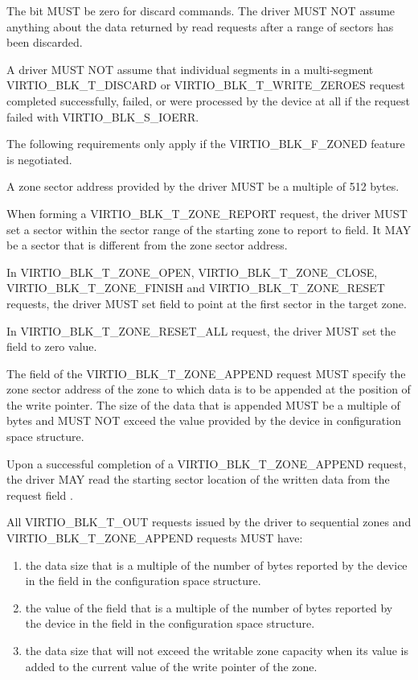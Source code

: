 The  bit MUST be zero for discard commands.  The driver
MUST NOT assume anything about the data returned by read requests after
a range of sectors has been discarded.

A driver MUST NOT assume that individual segments in a multi-segment
VIRTIO_BLK_T_DISCARD or VIRTIO_BLK_T_WRITE_ZEROES request completed
successfully, failed, or were processed by the device at all if the request
failed with VIRTIO_BLK_S_IOERR.

The following requirements only apply if the VIRTIO_BLK_F_ZONED feature is
negotiated.

A zone sector address provided by the driver MUST be a multiple of 512 bytes.

When forming a VIRTIO_BLK_T_ZONE_REPORT request, the driver MUST set a sector
within the sector range of the starting zone to report to  field.
It MAY be a sector that is different from the zone sector address.

In VIRTIO_BLK_T_ZONE_OPEN, VIRTIO_BLK_T_ZONE_CLOSE, VIRTIO_BLK_T_ZONE_FINISH and
VIRTIO_BLK_T_ZONE_RESET requests, the driver MUST set  field to
point at the first sector in the target zone.

In VIRTIO_BLK_T_ZONE_RESET_ALL request, the driver MUST set the field
 to zero value.

The  field of the VIRTIO_BLK_T_ZONE_APPEND request MUST specify
the zone sector address of the zone to which data is to be appended at the
position of the write pointer. The size of the data that is appended MUST be a
multiple of  bytes and MUST NOT exceed the
 value provided by the device in
 configuration space structure.

Upon a successful completion of a VIRTIO_BLK_T_ZONE_APPEND request, the driver
MAY read the starting sector location of the written data from the request
field .

All VIRTIO_BLK_T_OUT requests issued by the driver to sequential zones and
VIRTIO_BLK_T_ZONE_APPEND requests MUST have:

\begin{enumerate}
\item the data size that is a multiple of the number of bytes reported
    by the device in the field  in the
     configuration space structure.

\item the value of the field  that is a multiple of the number of
    bytes reported by the device in the field  in the
     configuration space structure.

\item the data size that will not exceed the writable zone capacity when its
    value is added to the current value of the write pointer of the zone.

\end{enumerate}

